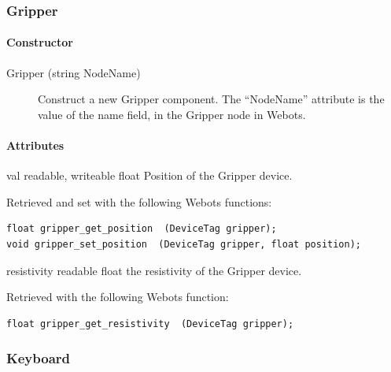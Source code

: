 \subsubsection{Gripper}
\label{webots.uobjects.robotdevices.gripper}%

\paragraph{Constructor}
\label{webots.uobjects.robotdevices.gripper.constructor}%

\noindent
\begin{description}
\item[{Gripper (string NodeName)}] Construct a new Gripper component. The ``NodeName'' attribute is the value
          of the name field, in the Gripper node in Webots.

\end{description}

\paragraph{Attributes}
\label{webots.uobjects.robotdevices.gripper.attributes}%

\noindent
\begin{itemize}
\begin{attribute}{val}
  {readable, writeable}
  {float}
  {}
  Position of the Gripper device.


 Retrieved and set with the following Webots functions:


\begin{lstlisting}
float gripper_get_position  (DeviceTag gripper);
void gripper_set_position  (DeviceTag gripper, float position);
\end{lstlisting}
\end{attribute}

\begin{attribute}{resistivity}
  {readable}
  {float}
  {}
  the resistivity of the Gripper device.


 Retrieved with the following Webots function:


\begin{lstlisting}
float gripper_get_resistivity  (DeviceTag gripper);
\end{lstlisting}
\end{attribute}

\end{itemize}

\subsubsection{Keyboard}
\label{webots.uobjects.robotdevices.keyboard}%

